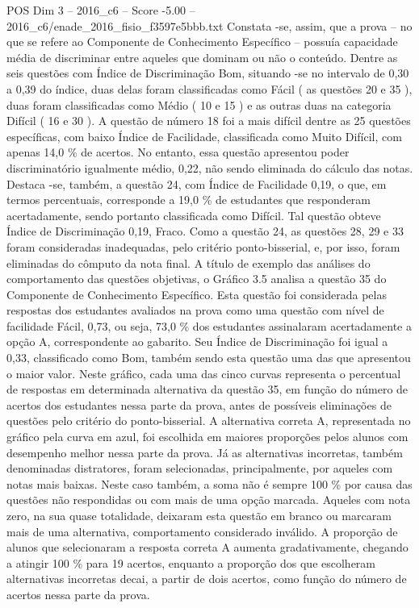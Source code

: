 \begin{textsample}{POS Dim 3 – 2016\_c6 – Score -5.00 – 2016\_c6/enade\_2016\_fisio\_f3597e5bbb.txt}
Constata -se, assim, que a prova – no que se refere ao Componente de Conhecimento Específico – possuía capacidade média de discriminar entre aqueles que dominam ou não o conteúdo.
Dentre as seis questões com Índice de Discriminação Bom, situando -se no intervalo de 0,30 a 0,39 do índice, duas delas foram classificadas como Fácil ( as questões 20 e 35 ), duas foram classificadas como Médio ( 10 e 15 ) e as outras duas na categoria Difícil ( 16 e 30 ).
A questão de número 18 foi a mais difícil dentre as 25 questões específicas, com baixo Índice de Facilidade, classificada como Muito Difícil, com apenas 14,0 \% de acertos.
No entanto, essa questão apresentou poder discriminatório igualmente médio, 0,22, não sendo eliminada do cálculo das notas.
Destaca -se, também, a questão 24, com Índice de Facilidade 0,19, o que, em termos percentuais, corresponde a 19,0 \% de estudantes que responderam acertadamente, sendo portanto classificada como Difícil.
Tal questão obteve Índice de Discriminação 0,19, Fraco.
Como a questão 24, as questões 28, 29 e 33 foram consideradas inadequadas, pelo critério ponto-bisserial, e, por isso, foram eliminadas do cômputo da nota final.
A título de exemplo das análises do comportamento das questões objetivas, o Gráfico 3.5 analisa a questão 35 do Componente de Conhecimento Específico.
Esta questão foi considerada pelas respostas dos estudantes avaliados na prova como uma questão com nível de facilidade Fácil, 0,73, ou seja, 73,0 \% dos estudantes assinalaram acertadamente a opção A, correspondente ao gabarito.
Seu Índice de Discriminação foi igual a 0,33, classificado como Bom, também sendo esta questão uma das que apresentou o maior valor.
Neste gráfico, cada uma das cinco curvas representa o percentual de respostas em determinada alternativa da questão 35, em função do número de acertos dos estudantes nessa parte da prova, antes de possíveis eliminações de questões pelo critério do ponto-bisserial.
A alternativa correta A, representada no gráfico pela curva em azul, foi escolhida em maiores proporções pelos alunos com desempenho melhor nessa parte da prova.
Já as alternativas incorretas, também denominadas distratores, foram selecionadas, principalmente, por aqueles com notas mais baixas.
Neste caso também, a soma não é sempre 100 \% por causa das questões não respondidas ou com mais de uma opção marcada.
Aqueles com nota zero, na sua quase totalidade, deixaram esta questão em branco ou marcaram mais de uma alternativa, comportamento considerado inválido.
A proporção de alunos que selecionaram a resposta correta A aumenta gradativamente, chegando a atingir 100 \% para 19 acertos, enquanto a proporção dos que escolheram alternativas incorretas decai, a partir de dois acertos, como função do número de acertos nessa parte da prova.

\end{textsample}
